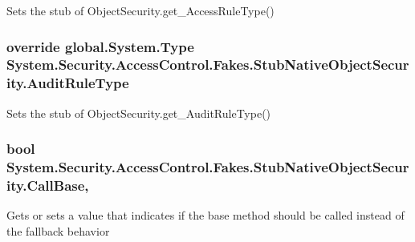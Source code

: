 Sets the stub of Object\-Security.\-get\-\_\-\-Access\-Rule\-Type()

\hypertarget{class_system_1_1_security_1_1_access_control_1_1_fakes_1_1_stub_native_object_security_a86e747a8a54cb01e528e568e711b312c}{
\subsubsection[{Audit\-Rule\-Type}]{\setlength{\rightskip}{0pt plus 5cm}override global.\-System.\-Type System.\-Security.\-Access\-Control.\-Fakes.\-Stub\-Native\-Object\-Security.\-Audit\-Rule\-Type\hspace{0.3cm}{\ttfamily [get]}}}\label{class_system_1_1_security_1_1_access_control_1_1_fakes_1_1_stub_native_object_security_a86e747a8a54cb01e528e568e711b312c}


Sets the stub of Object\-Security.\-get\-\_\-\-Audit\-Rule\-Type()

\hypertarget{class_system_1_1_security_1_1_access_control_1_1_fakes_1_1_stub_native_object_security_a362a3f4be686f90b97a7c7c1857e6ed1}{
\subsubsection[{Call\-Base}]{\setlength{\rightskip}{0pt plus 5cm}bool System.\-Security.\-Access\-Control.\-Fakes.\-Stub\-Native\-Object\-Security.\-Call\-Base\hspace{0.3cm}{\ttfamily [get]}, {\ttfamily [set]}}}\label{class_system_1_1_security_1_1_access_control_1_1_fakes_1_1_stub_native_object_security_a362a3f4be686f90b97a7c7c1857e6ed1}


Gets or sets a value that indicates if the base method should be called instead of the fallback behavior

